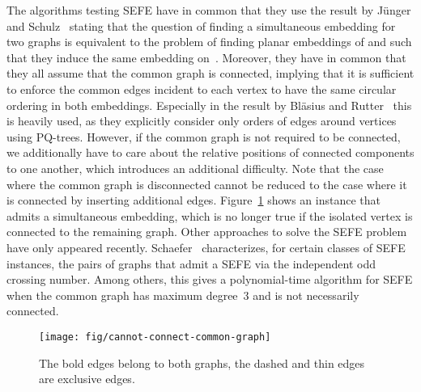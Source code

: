 \documentclass{scrartcl}
\newcommand{\1}[1]{{\normalfont \ensuremath{#1^{\tiny\circled{1}}}}} \newcommand{\2}[1]{{\normalfont \ensuremath{#1^{\tiny\circled{2}}}}} \renewcommand{\k}[1]{{\normalfont \ensuremath{#1^{\tiny\circled{k}}}}} \newcommand{\proj}[2]{\ensuremath{\left.#1\right|_{#2}}} \newcommand{\eps}{\varepsilon}
\theoremstyle{plain} \newtheorem{theorem}{Theorem} \newcounter{lemmacounter} \setcounter{lemmacounter}{0} \newtheorem{lemma}[lemmacounter]{Lemma} \newtheorem{fact}{Fact}  \newtheorem{corollary}{Corollary} \theoremstyle{definition} \newtheorem{definition}{Definition}
\begin{document}
The algorithms testing {\sc SEFE} have in common that they use the
result by Jünger and
Schulz~\cite{IntersectionGraphsin-Juenger.Schulz(09)} stating that the
question of finding a simultaneous embedding for two graphs is
equivalent to the problem of finding planar embeddings of  and
 such that they induce the same embedding on~.  Moreover, they
have in common that they all assume that the common graph is
connected, implying that it is sufficient to enforce the common edges
incident to each vertex to have the same circular ordering in both
embeddings.  Especially in the result by Bläsius and
Rutter~\cite{br-spqoacep-13} this is heavily used, as they explicitly
consider only orders of edges around vertices using PQ-trees.
However, if the common graph is not required to be connected, we
additionally have to care about the relative positions of connected
components to one another, which introduces an additional difficulty.
Note that the case where the common graph is disconnected cannot be
reduced to the case where it is connected by inserting additional
edges.  Figure~\ref{fig:cannot-connect-common-graph} shows an instance
that admits a simultaneous embedding, which is no longer true if the
isolated vertex  is connected to the remaining graph.  Other
approaches to solve the SEFE problem have only appeared recently.
Schaefer~\cite{s-ttp-13} characterizes, for certain classes of SEFE
instances, the pairs of graphs that admit a SEFE via the independent
odd crossing number.  Among others, this gives a polynomial-time
algorithm for SEFE when the common graph has maximum degree~3 and is
not necessarily connected.

\begin{figure}
  \centering
  \texttt{[image: fig/cannot-connect-common-graph]}
  \caption{The bold edges belong to both graphs, the dashed and thin
    edges are exclusive edges.}
  \label{fig:cannot-connect-common-graph}
\end{figure}
\end{document}
